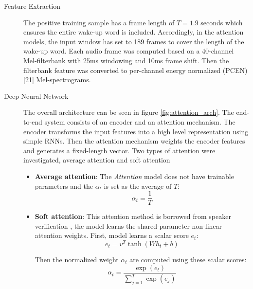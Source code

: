         \begin{description}
            \item[Feature Extraction] The positive training sample has a frame length of $T = 1.9$ seconds which ensures the entire wake-up word is included. 
            Accordingly, in the attention models, the input window has set to 189 frames to cover the length of the wake-up word.
            Each audio frame was computed based on a 40-channel Mel-filterbank with 25ms windowing and 10ms frame shift. 
            Then the filterbank feature was converted to per-channel energy normalized (PCEN) [21] Mel-spectrograms.

            \item[Deep Neural Network] The overall architecture can be seen in figure \ref{fig:attention_arch}.
            The end-to-end system consists of an encoder and an attention mechanism. 
            The encoder transforms the input features into a high level representation using simple RNNs. 
            Then the attention mechanism weights the encoder features and generates a fixed-length vector.
            Two types of attention were investigated, average attention and soft attention
            \begin{itemize}
                \item \textbf{Average attention}: The \textit{Attention} model does not have trainable parameters and the $\alpha_{t}$ is set as the average of $T$:
                \begin{equation}
                    \alpha_{t} = \frac{1}{T}
                \end{equation}

                \item \textbf{Soft attention}: This attention method is borrowed from speaker verification \cite{abc}, the model learns the shared-parameter non-linear attention weights.
                First, model learns a scalar score $e_{t}$:
                \begin{equation}
                    e_{t} = v^{T}\tanh(Wh_{t} + b)
                \end{equation}

                Then the normalized weight $\alpha_{t}$ are computed using these scalar scores:
                \begin{equation}
                    \alpha_{t} = \frac{\exp(e_{t})}{\sum_{j=1}^{T}{\exp(e_{j})}}
                \end{equation}


\end{itemize}
\end{description}
